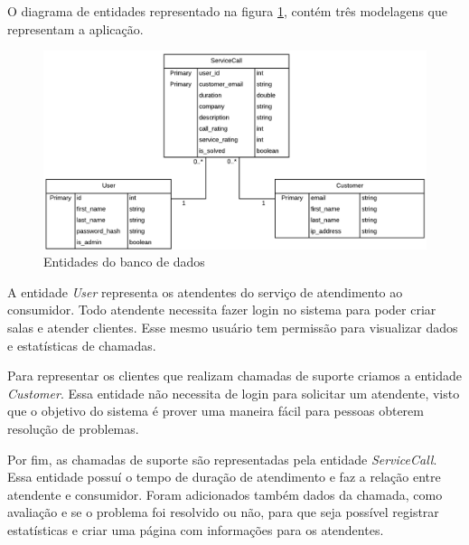 O diagrama de entidades representado na figura \ref{fig:database_model}, contém três modelagens que representam a aplicação. 

\begin{figure}[ht!]
	\centering
		\includegraphics[scale=0.8]{figures/database-model.png} 
	\caption{Entidades do banco de dados}
	\label{fig:database_model}
\end{figure}

A entidade \textit{User} representa os atendentes do serviço de atendimento ao consumidor. Todo atendente necessita fazer login no sistema para poder criar salas e atender clientes. Esse mesmo usuário tem permissão para visualizar dados e estatísticas de chamadas.

Para representar os clientes que realizam chamadas de suporte criamos a entidade \textit{Customer}. Essa entidade não necessita de login para solicitar um atendente, visto que o objetivo do sistema é prover uma maneira fácil para pessoas obterem resolução de problemas.

Por fim, as chamadas de suporte são representadas pela entidade \textit{ServiceCall}. Essa entidade possuí o tempo de duração de atendimento e faz a relação entre atendente e consumidor. Foram adicionados também dados da chamada, como avaliação e se o problema foi resolvido ou não, para que seja possível registrar estatísticas e criar uma página com informações para os atendentes.

